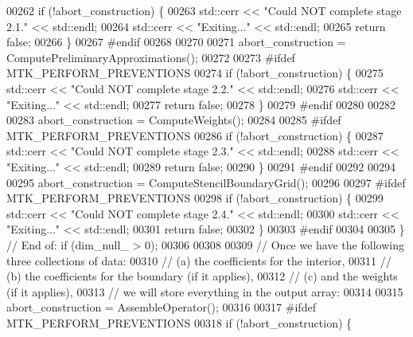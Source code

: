 \begin{DoxyCode}
{{00262     \textcolor{keywordflow}{if} (!abort\_construction) \{
00263       std::cerr << \textcolor{stringliteral}{"Could NOT complete stage 2.1."} << std::endl;
00264       std::cerr << \textcolor{stringliteral}{"Exiting..."} << std::endl;
00265       \textcolor{keywordflow}{return} \textcolor{keyword}{false};
00266     \}
00267 \textcolor{preprocessor}{    #endif}
00268 
00270 
00271     abort\_construction = ComputePreliminaryApproximations();
00272 
00273 \textcolor{preprocessor}{    #ifdef MTK\_PERFORM\_PREVENTIONS}
00274     \textcolor{keywordflow}{if} (!abort\_construction) \{
00275       std::cerr << \textcolor{stringliteral}{"Could NOT complete stage 2.2."} << std::endl;
00276       std::cerr << \textcolor{stringliteral}{"Exiting..."} << std::endl;
00277       \textcolor{keywordflow}{return} \textcolor{keyword}{false};
00278     \}
00279 \textcolor{preprocessor}{    #endif}
00280 
00282 
00283     abort\_construction = ComputeWeights();
00284 
00285 \textcolor{preprocessor}{    #ifdef MTK\_PERFORM\_PREVENTIONS}
00286     \textcolor{keywordflow}{if} (!abort\_construction) \{
00287       std::cerr << \textcolor{stringliteral}{"Could NOT complete stage 2.3."} << std::endl;
00288       std::cerr << \textcolor{stringliteral}{"Exiting..."} << std::endl;
00289       \textcolor{keywordflow}{return} \textcolor{keyword}{false};
00290     \}
00291 \textcolor{preprocessor}{    #endif}
00292 
00294 
00295     abort\_construction = ComputeStencilBoundaryGrid();
00296 
00297 \textcolor{preprocessor}{    #ifdef MTK\_PERFORM\_PREVENTIONS}
00298     \textcolor{keywordflow}{if} (!abort\_construction) \{
00299       std::cerr << \textcolor{stringliteral}{"Could NOT complete stage 2.4."} << std::endl;
00300       std::cerr << \textcolor{stringliteral}{"Exiting..."} << std::endl;
00301       \textcolor{keywordflow}{return} \textcolor{keyword}{false};
00302     \}
00303 \textcolor{preprocessor}{    #endif}
00304 
00305   \} \textcolor{comment}{// End of: if (dim\_null\_ > 0);}
00306 
00308 
00309   \textcolor{comment}{// Once we have the following three collections of data:}
00310   \textcolor{comment}{//   (a) the coefficients for the interior,}
00311   \textcolor{comment}{//   (b) the coefficients for the boundary (if it applies),}
00312   \textcolor{comment}{//   (c) and the weights (if it applies),}
00313   \textcolor{comment}{// we will store everything in the output array:}
00314 
00315   abort\_construction = AssembleOperator();
00316 
00317 \textcolor{preprocessor}{  #ifdef MTK\_PERFORM\_PREVENTIONS}
00318   \textcolor{keywordflow}{if} (!abort\_construction) \{
}}
\end{DoxyCode}

